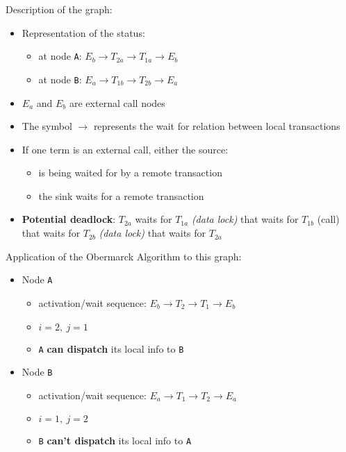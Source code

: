 \documentclass[english]{article}
\begin{document}
Description of the graph:
\begin{itemize}
  \item Representation of the status:
        \begin{itemize}
          \item at node \texttt{A}: \(E_b \rightarrow T_{2a} \rightarrow T_{1a} \rightarrow E_b\)
          \item at node \texttt{B}: \(E_a \rightarrow T_{1b} \rightarrow T_{2b} \rightarrow E_a\)
        \end{itemize}
  \item \(E_a\) and \(E_b\) are external call nodes
  \item The symbol \(\rightarrow\) represents the wait for relation between local transactions
  \item If one term is an external call, either the source:
        \begin{itemize}
          \item is being waited for by a remote transaction
          \item the sink waits for a remote transaction
        \end{itemize}
  \item \textbf{Potential deadlock}: \(T_{2a}\) waits for \(T_{1a}\) \textit{(data lock)} that waits for \(T_{1b}\) (call) that waits for \(T_{2b}\) \textit{(data lock)} that waits for \(T_{2a}\)
\end{itemize}

Application of the Obermarck Algorithm to this graph:
\begin{itemize}
  \item Node \texttt{A}
        \begin{itemize}
          \item activation/wait sequence: \(E_b \rightarrow T_{2} \rightarrow T_{1} \rightarrow E_b\)
          \item \(i = 2,\ j = 1\)
          \item \texttt{A} \textbf{can dispatch} its local info to \texttt{B}
        \end{itemize}
  \item Node \texttt{B}
        \begin{itemize}
          \item activation/wait sequence: \(E_a \rightarrow T_{1} \rightarrow T_{2} \rightarrow E_a\)
          \item \(i = 1,\ j = 2\)
          \item \texttt{B} \textbf{can't dispatch} its local info to \texttt{A}
        \end{itemize}
\end{itemize}
\end{document}
